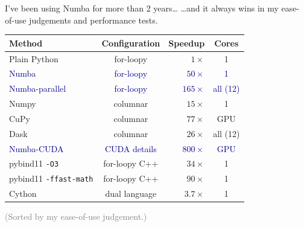 \documentclass[aspectratio=169]{beamer}
\begin{document}
\begin{frame}{I've been using Numba for more than 2 years\ldots}
\vspace{0.5 cm}
{\large \ldots and it always wins in my ease-of-use judgements and performance tests.}

\begin{center}
\begin{tabular}{l c r c}
{\bf Method}               & {\bf Configuration} & {\bf Speedup} & {\bf Cores} \\\hline
Plain Python               & for-loopy           &     $1\times$ & 1 \\
\textcolor{darkblue}{Numba}                      & \textcolor{darkblue}{for-loopy}           &    \textcolor{darkblue}{$50\times$} & \textcolor{darkblue}{1} \\
\textcolor{darkblue}{Numba-parallel}             & \textcolor{darkblue}{for-loopy}           &   \textcolor{darkblue}{$165\times$} & \textcolor{darkblue}{all (12)} \\
Numpy                      & columnar            &    $15\times$ & 1 \\
CuPy                       & columnar            &    $77\times$ & GPU \\
Dask                       & columnar            &    $26\times$ & all (12) \\
\textcolor{darkblue}{Numba-CUDA}                 & \textcolor{darkblue}{CUDA details}        &   \textcolor{darkblue}{$800\times$} & \textcolor{darkblue}{GPU} \\
pybind11 {\tt -O3}         & for-loopy C++       &    $34\times$ & 1 \\
pybind11 {\tt -ffast-math} & for-loopy C++       &    $90\times$ & 1 \\
Cython                     & dual language       &   $3.7\times$ & 1 \\
\end{tabular}
\end{center}

\textcolor{gray}{(Sorted by my ease-of-use judgement.)}
\end{frame}
\end{document}

